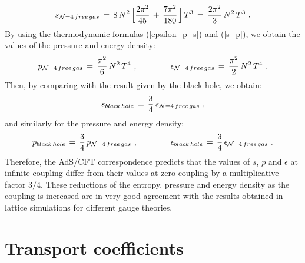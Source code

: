 \documentclass[12pt,notitlepage,a4paper]{article}
\newcommand{\beq}{\begin{equation}}
\newcommand{\eeq}{\end{equation}}
\begin{document}
\beq
s_{{\cal N}=4\,free\, gas}\,=\,
8\,N^2\,\Big[{2\pi^2\over 45}\,+\,{7\pi^2\over 180}\,\Big]\,T^3\,=\,{2\pi^2\over 3}\,
N^2\,T^3\,\,.
\eeq
By using the thermodynamic formulas (\ref{epsilon_p_s}) and (\ref{s_p}), we obtain the values of the pressure and energy density:
\beq
p_{{\cal N}=4\,free\, gas}\,=\,{\pi^2\over 6}\,
N^2\,T^4\,\,,
\qquad\qquad
\epsilon_{{\cal N}=4\,free\, gas}\,=\,{\pi^2\over 2}\,
N^2\,T^4\,\,.
\eeq
Then, by comparing with the result given by the black hole, we obtain:
\beq
s_{black\, hole}\,=\,{3\over 4}\,s_{{\cal N}=4\,free\, gas}\,\,,
\label{sbh-sgass}
\eeq
and similarly for the pressure and energy density:
\beq
p_{black\, hole}\,=\,{3\over 4}\,p_{{\cal N}=4\,free\, gas}\,\,,
\qquad\qquad
\epsilon_{black\, hole}\,=\,{3\over 4}\,\epsilon_{{\cal N}=4\,free\, gas}\,\,.
\label{p-epsilon_bh-sgass}
\eeq
Therefore, the AdS/CFT correspondence predicts that the values of $s$, $p$ and $\epsilon$ at infinite coupling differ from their values at   zero coupling by a multiplicative  factor $3/4$. These reductions of the entropy, pressure and energy density as the coupling is increased are in very good agreement with the results obtained in lattice simulations for different gauge theories. 


\section{Transport coefficients}
\label{transport_coefficients}
\end{document}

